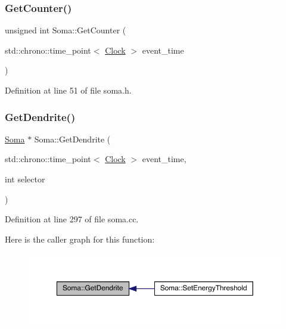 \subsubsection{\texorpdfstring{Get\+Counter()}{GetCounter()}}
{\footnotesize\ttfamily unsigned int Soma\+::\+Get\+Counter (\begin{DoxyParamCaption}\item[{std\+::chrono\+::time\+\_\+point$<$ \hyperlink{universe_8h_a0ef8d951d1ca5ab3cfaf7ab4c7a6fd80}{Clock} $>$}]{event\+\_\+time }\end{DoxyParamCaption})\hspace{0.3cm}{\ttfamily [inline]}}



Definition at line 51 of file soma.\+h.

\mbox{\label{class_soma_ab86537170d550cda0e7da080f7640f84}} 
\subsubsection{\texorpdfstring{Get\+Dendrite()}{GetDendrite()}}
{\footnotesize\ttfamily \hyperlink{class_soma}{Soma} $\ast$ Soma\+::\+Get\+Dendrite (\begin{DoxyParamCaption}\item[{std\+::chrono\+::time\+\_\+point$<$ \hyperlink{universe_8h_a0ef8d951d1ca5ab3cfaf7ab4c7a6fd80}{Clock} $>$}]{event\+\_\+time,  }\item[{int}]{selector }\end{DoxyParamCaption})}



Definition at line 297 of file soma.\+cc.

Here is the caller graph for this function\+:
\nopagebreak
\begin{figure}[H]
\begin{center}
\leavevmode
\includegraphics[width=350pt]{class_soma_ab86537170d550cda0e7da080f7640f84_icgraph}
\end{center}
\end{figure}
\mbox{\label{class_soma_a000d9eca00c61af853fd81a2c1569b0e}} 
